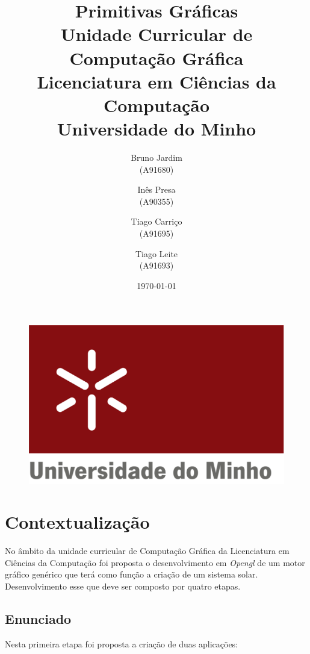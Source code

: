 \documentclass[11pt,a4paper]{report}
\begin{document}
\begin{figure}
    \includegraphics[scale=0.3]{logoum.png}
\end{figure}
\title{\textbf{Primitivas Gráficas}\\
       \textbf{Unidade Curricular de Computação Gráfica}\\ Licenciatura em Ciências da Computação\\Universidade do Minho
       } %
\author{Bruno Jardim\\ (A91680) \and Inês Presa\\ (A90355)
         \and Tiago Carriço\\ (A91695) \and Tiago Leite\\ (A91693)
       } %
\date{\today} %
\maketitle
\begingroup
\renewcommand*\contentsname{Índice}
\let\clearpage\relax
\tableofcontents


\endgroup
\newpage

\chapter{Contextualização}    
No âmbito da unidade curricular de Computação Gráfica da Licenciatura em Ciências da Computação foi proposta o desenvolvimento em \textit{Opengl} de um motor gráfico genérico que terá como função a criação de um sistema solar. Desenvolvimento esse que deve ser composto por quatro etapas. 

\section{Enunciado}
Nesta primeira etapa foi proposta a criação de duas aplicações:
\end{document}
